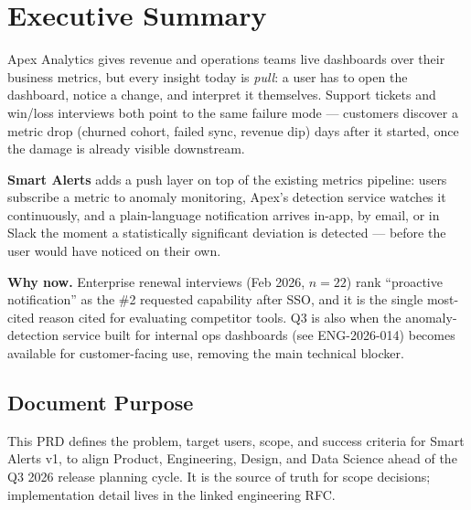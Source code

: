 \section{Executive Summary}

Apex Analytics gives revenue and operations teams live dashboards over their business
metrics, but every insight today is \emph{pull}: a user has to open the dashboard, notice a
change, and interpret it themselves. Support tickets and win/loss interviews both point to
the same failure mode --- customers discover a metric drop (churned cohort, failed sync,
revenue dip) days after it started, once the damage is already visible downstream.

\textbf{Smart Alerts} adds a push layer on top of the existing metrics pipeline: users
subscribe a metric to anomaly monitoring, Apex's detection service watches it continuously,
and a plain-language notification arrives in-app, by email, or in Slack the moment a
statistically significant deviation is detected --- before the user would have noticed on
their own.

\begin{statusbox}
\textbf{\color{prdaccent}Why now.} Enterprise renewal interviews (Feb 2026, $n=22$) rank
``proactive notification'' as the \#2 requested capability after SSO, and it is the single
most-cited reason cited for evaluating competitor tools. Q3 is also when the anomaly-detection
service built for internal ops dashboards (see ENG-2026-014) becomes available for
customer-facing use, removing the main technical blocker.
\end{statusbox}

\subsection*{Document Purpose}
This PRD defines the problem, target users, scope, and success criteria for Smart Alerts
v1, to align Product, Engineering, Design, and Data Science ahead of the Q3 2026 release
planning cycle. It is the source of truth for scope decisions; implementation detail lives
in the linked engineering RFC.
